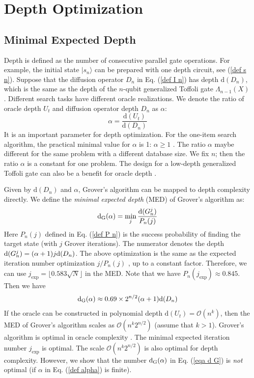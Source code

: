\documentclass[%
 twocolumn,
 10pt,
 superscriptaddress,
 longbibliography,
 amsmath,amssymb,
 aps,
 pra,
floatfix,
]{revtex4-1}
\newcommand{\eq}{\begin{equation}}
\newcommand{\en}{\end{equation}}
\begin{document}
\section{\label{sec:dep_opt}Depth Optimization}

\subsection{\label{subsec:MED}Minimal Expected Depth}

Depth is defined as the number of consecutive parallel gate operations. For example, the initial state $|s_n\rangle$ can be prepared with one depth circuit, see (\ref{def s n}). Suppose that the diffusion operator $D_n$ in Eq. (\ref{def I n}) has depth $\text{d}(D_n)$, which is the same as the depth of the $n$-qubit generalized Toffoli gate $\Lambda_{n-1}(X)$ \cite{NC10}. Different search tasks have different oracle realizations. We denote the ratio of  oracle depth $U_t$ and diffusion operator depth $D_n$ as $\alpha$:
\eq
\label{def alpha}
\alpha = \frac{\text{d}(U_t)}{\text{d}(D_n)}
\en
It is an important parameter for depth optimization. For the one-item search algorithm, the practical minimal value for $\alpha$ is 1: $\alpha\geq1$ \cite{FMLLDM17}. The ratio $\alpha$ maybe different for the same problem with a different database size. We fix $n$; then the ratio $\alpha$ is a constant for one problem. The design for a low-depth generalized Toffoli gate can also be a benefit for oracle depth \cite{GBDBRC19}.

Given by $\text{d}(D_n)$ and $\alpha$, Grover's algorithm can be mapped to depth complexity directly. We define the \textit{minimal expected depth} (MED) of Grover's algorithm as:
\begin{equation}
	\label{def d G}
	\text d_\text{G}(\alpha) = \min_j \frac{\text d(G_n^j)}{P_n(j)}
\end{equation}
Here $P_n(j)$ defined in Eq. (\ref{def P n}) is the success probability of finding the target state (with $j$ Grover iterations). The numerator denotes the depth $\text d(G_n^j)=(\alpha+1)j\text d(D_n)$. The above optimization is the same as the expected iteration number optimization $j/P_n(j)$ \cite{BBHT98,GWC00}, up to a constant factor. Therefore, we can use $j_\text{exp}=\lfloor 0.583\sqrt N \rfloor$ in the MED. Note that we have $P_n(j_\text{exp})\approx 0.845$. Then we have
\begin{equation}
	\label{eqa d G}
	\text d_\text{G}(\alpha) \approx 0.69\times 2^{n/2}(\alpha+1)\text d(D_n)
\end{equation}
If the oracle can be constructed in polynomial depth $\text{d}(U_t)=\mathcal O(n^k)$, then the MED of Grover's algorithm scales as $\mathcal O(n^{k}2^{n/2})$ (assume that $k>1$). Grover's algorithm is optimal in oracle complexity \cite{BBHT98,Zalka99}. The minimal expected iteration number $j_\text{exp}$ is optimal. The scale $\mathcal O(n^{k}2^{n/2})$ is also optimal for depth complexity. However, we show that the number $\text d_\text{G}(\alpha)$ in Eq. (\ref{eqa d G}) is {\it not} optimal (if $\alpha$ in Eq. (\ref{def alpha}) is finite).
\end{document}
